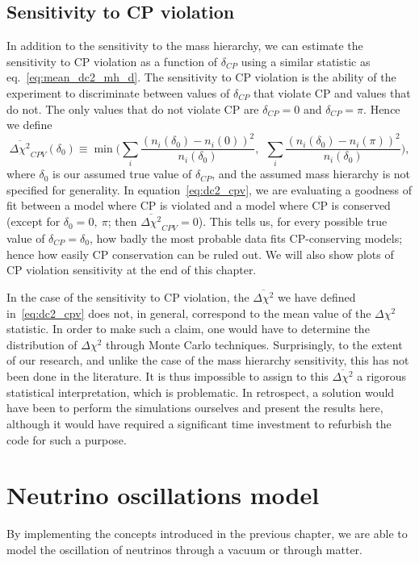 \subsection{Sensitivity to CP violation}
In addition to the sensitivity to the mass hierarchy, we can estimate the
sensitivity to CP violation as a function of $\delta_{CP}$ using a similar
statistic as eq.~\ref{eq:mean_dc2_mh_d}. The sensitivity to CP violation
is the ability of the experiment to discriminate between values of
$\delta_{CP}$ that violate CP and values that do not. The only values that
do not violate CP are $\delta_{CP}=0$ and $\delta_{CP}=\pi$. Hence we define
\begin{equation}
	\overline{\Delta\chi^2}_{CPV}(\delta_0) \equiv \min\bigg(\sum_i
	\frac{(n_i(\delta_0) - n_i(0))^2}{n_i(\delta_0)},~~\sum_i
	\frac{(n_i(\delta_0) - n_i(\pi))^2}{n_i(\delta_0)}\bigg),\label{eq:dc2_cpv}
\end{equation}
where $\delta_0$ is our assumed true value of $\delta_{CP}$, and the assumed mass
hierarchy is not specified for generality. In equation~\ref{eq:dc2_cpv}, we are
evaluating a goodness of fit between a model where CP is violated and a model
where CP is conserved (except for $\delta_0=0,~\pi$; then
$\overline{\Delta\chi^2}_{CPV}=0$). 
This tells us, for every possible true value of $\delta_{CP}=\delta_0$, how
badly the most probable data fits CP-conserving models; hence how easily CP
conservation can be ruled out. We will also show plots of CP violation sensitivity
at the end of this chapter. 

In the case of the sensitivity to CP violation, the $\overline{\Delta\chi^2}$
we have defined in~\ref{eq:dc2_cpv} does not, in general, correspond to the mean
value of the $\Delta\chi^2$ statistic. In order to make such a claim, one would
have to determine the distribution of $\Delta\chi^2$ through Monte Carlo
techniques. Surprisingly, to the extent of our research, and unlike the case of
the mass hierarchy sensitivity, this has not been done in the literature.  It
is thus impossible to assign to this $\overline{\Delta\chi^2}$ a rigorous
statistical interpretation, which is problematic. In retrospect, a solution
would have been to perform the simulations ourselves and present the results
here, although it would have required a significant time investment to
refurbish the code for such a purpose.


\section{Neutrino oscillations model}
By implementing the concepts introduced in the previous chapter, we are able to
model the oscillation of neutrinos through a vacuum or through matter.


